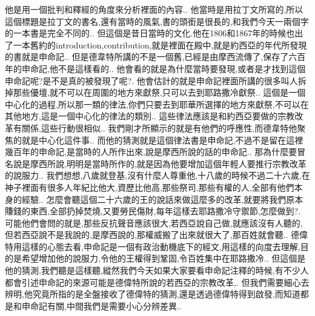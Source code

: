 \documentclass{book}
\begin{document}
他是用一個批判和釋經的角度來分析裡面的內容..
他當時是用拉丁文所寫的,所以這個標題是拉丁文的書名,還有當時的風氣,書的頭銜是很長的,和我們今天一兩個字的一本書是完全不同的..
但這個是昔日當時的文化.他在1806和1867年的時候也出了一本舊約的introduction,contribution,就是裡面在殿中,就是約西亞的年代所發現的書就是申命記..
但是德韋特所講的不是一個舊,已經是由摩西流傳了,保存了六百年的申命記,他不是這樣看的..
他會看的就是為什麼當時要發現,或者是才找到這個申命記呢?是不是真的被發現了呢?.
他會估計的就是申命記裡面所講的很多叫人拆掉那些優壇,就不可以在周圍的地方來獻祭,只可以去到耶路撒冷獻祭..
這個是一個中心化的過程,所以那一類的律法,你們只要去到耶華所選擇的地方來獻祭,不可以在其他地方,這是一個中心化的律法的類別..
這些律法應該是和約西亞要做的宗教改革有關係,這些行動很相似..
我們剛才所顯示的就是有他們的呼應性,而德韋特他聚焦的就是中心化這件事..
而他的猜測就是這個律法書是申命記,不過不是留在這裡幾百年的申命記,是當時的人所作出來,說是摩西所說的話的申命記..
那為什麼要冒名說是摩西所說,明明是當時所作的,就是因為他要增加這個年輕人要推行宗教改革的說服力..
我們想想,八歲就登基,沒有什麼人尊重他,十八歲的時候不過二十六歲,在神子裡面有很多人年紀比他大,資歷比他高,那些祭司,那些有權的人,全部有他們本身的經驗..
怎麼會聽這個二十六歲的王的說話來做這麼多的改革,就要將我們原本賺錢的東西,全部扔掉焚燒,又要勞民傷財,每年這樣去耶路撒冷守禦節,怎麼做到?.
可能他們會問的就是,那些反抗聲音應該很大,若西亞說自己做,就應該沒有人聽的,但若西亞說不是我說的,是摩西說的,那權威搬了出來就很大了,那百姓就會聽..
德偉特用這樣的心態去看,申命記是一個有政治動機底下的經文,用這樣的向度去理解,目的是希望增加他的說服力,令他的王權得到鞏固,令百姓集中在耶路撒冷..
但這個是他的猜測,我們聽是這樣聽,縱然我們今天如果大家要看申命記注釋的時候,有不少人都會引述申命記的來源可能是德偉特所說的若西亞的宗教改革,.
但我們需要細心去辨明,他究竟所指的是全盤接收了德偉特的猜測,還是透過德偉特得到啟發,而知道都是和申命記有關,中間我們是需要小心分辨差異..
\end{document}

